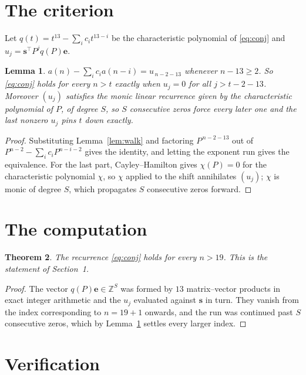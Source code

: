\documentclass[11pt,a4paper]{article}
\theoremstyle{plain}
\newtheorem{theorem}{Theorem}
\newtheorem{lemma}[theorem]{Lemma}
\theoremstyle{definition}
\begin{document}
\section{The criterion}

Let $q(t)=t^{13}-\sum_i c_i t^{13-i}$ be the characteristic polynomial of
\eqref{eq:conj} and $u_j=\mathbf{s}^{\!\top}P^{j}q(P)\mathbf{e}$.

\begin{lemma}\label{lem:crit}
$a(n)-\sum_i c_i a(n-i)=u_{\,n-2-13}$ whenever $n-13\ge2$. So \eqref{eq:conj}
holds for every $n>t$ exactly when $u_j=0$ for all $j>t-2-13$. Moreover $(u_j)$
satisfies the monic linear recurrence given by the characteristic polynomial of $P$, of
degree $S$, so $S$ consecutive zeros force every later one and the last nonzero $u_j$ pins
$t$ down exactly.
\end{lemma}

\begin{proof}
Substituting Lemma~\ref{lem:walk} and factoring $P^{\,n-2-13}$ out of
$P^{n-2}-\sum_i c_i P^{n-i-2}$ gives the identity, and letting the exponent run gives the
equivalence. For the last part, Cayley--Hamilton gives $\chi(P)=0$ for the characteristic
polynomial $\chi$, so $\chi$ applied to the shift annihilates $(u_j)$; $\chi$ is monic of
degree $S$, which propagates $S$ consecutive zeros forward.
\end{proof}

\section{The computation}

\begin{theorem}
The recurrence \eqref{eq:conj} holds for every $n>19$. This is the statement of
Section~1.
\end{theorem}

\begin{proof}
The vector $q(P)\mathbf{e}\in\mathbb{Z}^{S}$ was formed by $13$ matrix--vector
products in exact integer arithmetic and the $u_j$ evaluated against $\mathbf{s}$ in turn.
They vanish from the index corresponding to $n=19+1$ onwards, and the run was continued
past $S$ consecutive zeros, which by Lemma~\ref{lem:crit} settles every larger index.
\end{proof}

\section{Verification}
\end{document}
